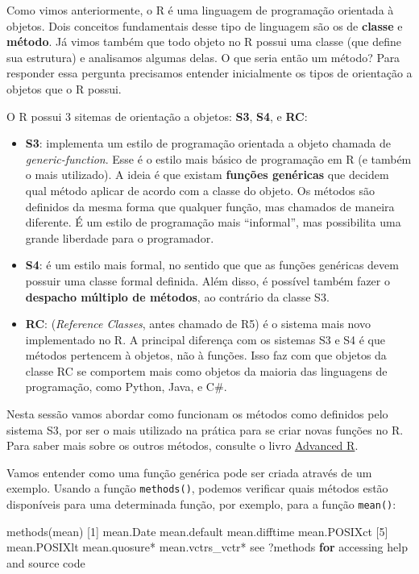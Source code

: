 \documentclass[
  10pt,
  a4paper]{book}
\newenvironment{Shaded}{\begin{snugshade}}{\end{snugshade}}
\newcommand{\ControlFlowTok}[1]{\textcolor[rgb]{0.13,0.29,0.53}{\textbf{#1}}}
\newcommand{\DecValTok}[1]{\textcolor[rgb]{0.00,0.00,0.81}{#1}}
\newcommand{\FunctionTok}[1]{\textcolor[rgb]{0.00,0.00,0.00}{#1}}
\newcommand{\NormalTok}[1]{#1}
\newcommand{\SpecialCharTok}[1]{\textcolor[rgb]{0.00,0.00,0.00}{#1}}
\newcommand{\StringTok}[1]{\textcolor[rgb]{0.31,0.60,0.02}{#1}}
\providecommand{\tightlist}{%
  \setlength{\itemsep}{0pt}\setlength{\parskip}{0pt}}
\begin{document}
Como vimos anteriormente, o R é uma linguagem de programação orientada à
objetos. Dois conceitos fundamentais desse tipo de linguagem são os de
\textbf{classe} e \textbf{método}. Já vimos também que todo objeto no R possui uma
classe (que define sua estrutura) e analisamos algumas delas. O que
seria então um método? Para responder essa pergunta precisamos entender
inicialmente os tipos de orientação a objetos que o R possui.

O R possui 3 sitemas de orientação a objetos: \textbf{S3}, \textbf{S4}, e \textbf{RC}:

\begin{itemize}
\tightlist
\item
  \textbf{S3}: implementa um estilo de programação orientada a objeto chamada
  de \emph{generic-function}. Esse é o estilo mais básico de programação em R
  (e também o mais utilizado). A ideia é que existam \textbf{funções
  genéricas} que decidem qual método aplicar de acordo com a classe do
  objeto. Os métodos são definidos da mesma forma que qualquer função,
  mas chamados de maneira diferente. É um estilo de programação mais
  ``informal'', mas possibilita uma grande liberdade para o programador.
\item
  \textbf{S4}: é um estilo mais formal, no sentido que que as funções
  genéricas devem possuir uma classe formal definida. Além disso, é
  possível também fazer o \textbf{despacho múltiplo de métodos}, ao contrário
  da classe S3.
\item
  \textbf{RC}: (\emph{Reference Classes}, antes chamado de R5) é o sistema mais
  novo implementado no R. A principal diferença com os sistemas S3 e
  S4 é que métodos pertencem à objetos, não à funções. Isso faz com que
  objetos da classe RC se comportem mais como objetos da maioria das
  linguagens de programação, como Python, Java, e C\#.
\end{itemize}

Nesta sessão vamos abordar como funcionam os métodos como definidos pelo
sistema S3, por ser o mais utilizado na prática para se criar novas
funções no R. Para saber mais sobre os outros métodos, consulte o livro
\href{http://adv-r.had.co.nz/OO-essentials.html}{Advanced R}.

Vamos entender como uma função genérica pode ser criada através de um
exemplo. Usando a função \texttt{methods()}, podemos verificar quais métodos
estão disponíveis para uma determinada função, por exemplo, para a
função \texttt{mean()}:

\begin{Shaded}
\begin{Highlighting}[]
\FunctionTok{methods}\NormalTok{(mean)}
\NormalTok{[}\DecValTok{1}\NormalTok{] mean.Date        mean.default     mean.difftime    mean.POSIXct    }
\NormalTok{[}\DecValTok{5}\NormalTok{] mean.POSIXlt     mean.quosure}\SpecialCharTok{*}\NormalTok{    mean.vctrs\_vctr}\SpecialCharTok{*}
\NormalTok{see }\StringTok{\textquotesingle{}?methods\textquotesingle{}} \ControlFlowTok{for}\NormalTok{ accessing help and source code}
\end{Highlighting}
\end{Shaded}
\end{document}
